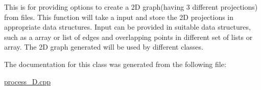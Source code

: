 This is for providing options to create a 2D graph(having 3 different projections) from files. This function will take a input and store the 2D projections in appropriate data structures. Input can be provided in suitable data structures, such as a array or list of edges and overlapping points in different set of lists or array. The 2D graph generated will be used by different classes.

The documentation for this class was generated from the following file\+:\begin{DoxyCompactItemize}
\item 
\hyperlink{process__2D_8cpp}{process\+\_\+D.\+cpp}\end{DoxyCompactItemize}
